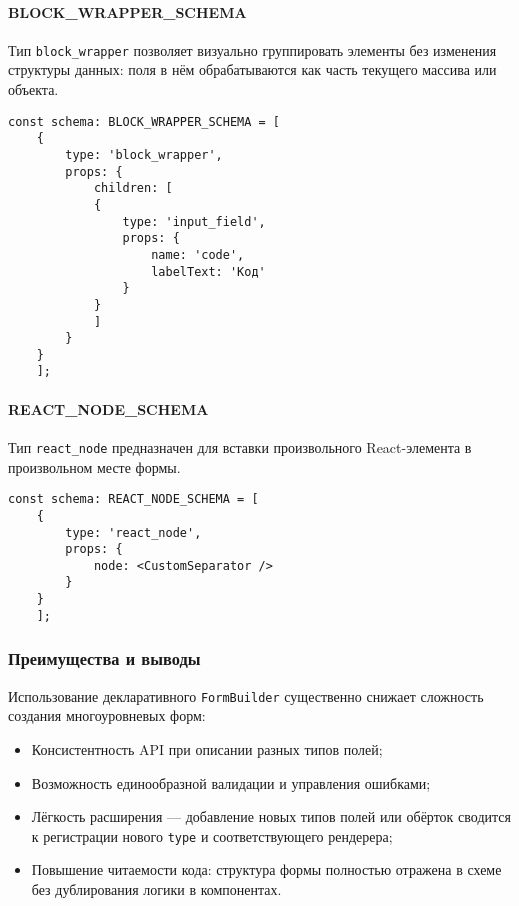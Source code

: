 \paragraph{BLOCK\_WRAPPER\_SCHEMA}
Тип \texttt{block\_wrapper} позволяет визуально группировать элементы без изменения структуры данных: поля в нём обрабатываются как часть текущего массива или объекта.

\begin{lstlisting}[caption={Пример BLOCK\_WRAPPER\_SCHEMA}]
	const schema: BLOCK_WRAPPER_SCHEMA = [
	{
		type: 'block_wrapper',
		props: {
			children: [
			{
				type: 'input_field',
				props: {
					name: 'code',
					labelText: 'Код'
				}
			}
			]
		}
	}
	];
\end{lstlisting}

\paragraph{REACT\_NODE\_SCHEMA}
Тип \texttt{react\_node} предназначен для вставки произвольного React-элемента в произвольном месте формы.
\begin{lstlisting}[caption={Пример REACT\_NODE\_SCHEMA}]
	const schema: REACT_NODE_SCHEMA = [
	{
		type: 'react_node',
		props: {
			node: <CustomSeparator />
		}
	}
	];
\end{lstlisting}

\subsubsection{Преимущества и выводы}
Использование декларативного \texttt{FormBuilder} существенно снижает сложность создания многоуровневых форм:
\begin{itemize}
	\item Консистентность API при описании разных типов полей;
	\item Возможность единообразной валидации и управления ошибками;
	\item Лёгкость расширения — добавление новых типов полей или обёрток сводится к регистрации нового \texttt{type} и соответствующего рендерера;
	\item Повышение читаемости кода: структура формы полностью отражена в схеме без дублирования логики в компонентах.
\end{itemize}

